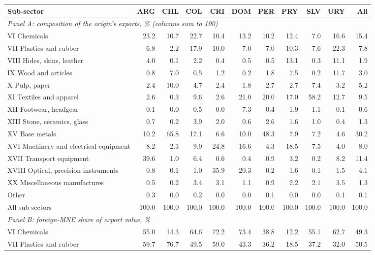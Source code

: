 \begin{tabular}{lrrrrrrrrrr}
\toprule
Sub-sector & ARG & CHL & COL & CRI & DOM & PER & PRY & SLV & URY & All \\
\midrule
\multicolumn{11}{l}{\textit{Panel A: composition of the origin's exports, \% (columns sum to 100)}} \\
VI Chemicals & 23.2 & 10.7 & 22.7 & 10.4 & 13.2 & 10.2 & 12.4 & 7.0 & 16.6 & 15.4 \\
VII Plastics and rubber & 6.8 & 2.2 & 17.9 & 10.0 & 7.0 & 7.0 & 10.3 & 7.6 & 22.3 & 7.8 \\
VIII Hides, skins, leather & 4.0 & 0.1 & 2.2 & 0.4 & 0.5 & 0.5 & 13.1 & 0.3 & 11.1 & 1.9 \\
IX Wood and articles & 0.8 & 7.0 & 0.5 & 1.2 & 0.2 & 1.8 & 7.5 & 0.2 & 11.7 & 3.0 \\
X Pulp, paper & 2.4 & 10.0 & 4.7 & 2.4 & 1.8 & 2.7 & 2.7 & 7.4 & 3.2 & 5.2 \\
XI Textiles and apparel & 2.6 & 0.3 & 9.6 & 2.6 & 21.0 & 20.0 & 17.0 & 58.2 & 12.7 & 9.5 \\
XII Footwear, headgear & 0.1 & 0.0 & 0.5 & 0.0 & 7.3 & 0.4 & 1.9 & 1.1 & 0.1 & 0.6 \\
XIII Stone, ceramics, glass & 0.7 & 0.2 & 3.9 & 2.0 & 0.6 & 2.6 & 1.6 & 1.0 & 0.4 & 1.3 \\
XV Base metals & 10.2 & 65.8 & 17.1 & 6.6 & 10.0 & 48.3 & 7.9 & 7.2 & 4.6 & 30.2 \\
XVI Machinery and electrical equipment & 8.2 & 2.3 & 9.9 & 24.8 & 16.6 & 4.3 & 18.5 & 7.5 & 4.0 & 8.0 \\
XVII Transport equipment & 39.6 & 1.0 & 6.4 & 0.6 & 0.4 & 0.9 & 3.2 & 0.2 & 8.2 & 11.4 \\
XVIII Optical, precision instruments & 0.8 & 0.1 & 1.0 & 35.9 & 20.3 & 0.2 & 1.6 & 0.1 & 1.5 & 4.1 \\
XX Miscellaneous manufactures & 0.5 & 0.2 & 3.4 & 3.1 & 1.1 & 0.9 & 2.2 & 2.1 & 3.5 & 1.3 \\
Other & 0.3 & 0.0 & 0.2 & 0.0 & 0.0 & 0.1 & 0.0 & 0.0 & 0.1 & 0.1 \\
All sub-sectors & 100.0 & 100.0 & 100.0 & 100.0 & 100.0 & 100.0 & 100.0 & 100.0 & 100.0 & 100.0 \\
\midrule
\multicolumn{11}{l}{\textit{Panel B: foreign-MNE share of export value, \%}} \\
VI Chemicals & 55.0 & 14.3 & 64.6 & 72.2 & 73.4 & 38.8 & 12.2 & 55.1 & 62.7 & 49.3 \\
VII Plastics and rubber & 59.7 & 76.7 & 49.5 & 59.0 & 43.3 & 36.2 & 18.5 & 37.2 & 32.0 & 50.5 \\

\end{tabular}
